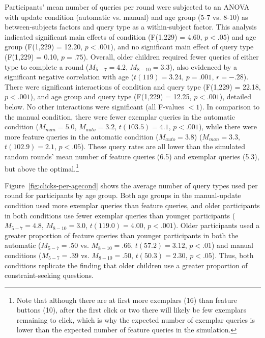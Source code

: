 \documentclass[man,floatsintext]{apa6}
\begin{document}
Participants' mean number of queries per round were subjected to an ANOVA with update condition 
(automatic vs. manual) and age group (5-7 vs. 8-10) as between-subjects factors and query type as 
a within-subject factor. This analysis indicated significant main effects of condition (F(1,229) = 4.60, $p<.05$) 
and age group (F(1,229) = 12.20, $p<.001$), and no significant main effect of query type 
(F(1,229) = 0.10, $p=.75$). Overall, older children required fewer queries of either type to complete a 
round ($M_{5-7} = 4.2$, $M_{8-10} = 3.3$), also evidenced by a significant negative correlation 
with age ($t(119) = 3.24$, $p=.001$, $r=-.28$). There were significant interactions of condition 
and query type (F(1,229) = 22.18, $p<.001$), and age group and query type (F(1,229) = 12.25, 
$p<.001$), detailed below. No other interactions were significant (all F-values $<1$).  
In comparison to the manual condition, 
there were fewer exemplar queries in the automatic condition ($M_{man} = 5.0$, 
$M_{auto} = 3.2$, $t(103.5)=4.1$, $p<.001$), while there were more feature queries 
in the automatic condition ($M_{auto} = 3.8$) ($M_{man} = 3.3$, $t(102.9)=2.1$, 
$p<.05$).
These query rates are all lower than the simulated random rounds' mean number of feature queries (6.5) and exemplar queries (5.3), but above the optimal.\footnote{Note that although there are at first more exemplars (16) than feature buttons (10), after the first click or two there will likely be few 
exemplars remaining to click, which is why the expected number of exemplar 
queries is lower than the expected number of feature queries in the simulation.} 

Figure~\ref{fig:clicks-per-agecond} shows the average number of query types used per 
round for participants by age group. Both age groups in the manual-update condition used 
more exemplar queries than feature queries, and older participants in both conditions use fewer exemplar queries than younger participants ($M_{5-7}=4.8$, $M_{8-10}=3.0$, $t(119.0)=4.00$, $p<.001$). Older participants used a greater proportion of feature queries than younger participants in both the automatic ($M_{5-7}=.50$ vs. $M_{8-10}=.66$, $t(57.2)=3.12$, $p<.01$) 
and manual conditions ($M_{5-7}=.39$ vs. $M_{8-10}=.50$, $t(50.3)=2.30$, $p<.05$). Thus, both 
conditions replicate the  finding that older children use a greater proportion of 
constraint-seeking questions. 
\end{document}
